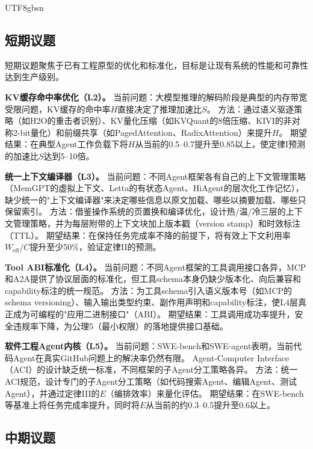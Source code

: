 \documentclass[11pt,a4paper]{article}
\begin{document}
\begin{CJK*}{UTF8}{gbsn}
\subsection{短期议题}

短期议题聚焦于已有工程原型的优化和标准化，目标是让现有系统的性能和可靠性达到生产级别。

\textbf{KV缓存命中率优化（L2）。}
当前问题：大模型推理的解码阶段是典型的内存带宽受限问题\cite{gholami2024memorywall}，KV缓存的命中率$H$直接决定了推理加速比$S$。
方法：通过语义驱逐策略（如H2O的重击者识别\cite{h2o2023}）、KV量化压缩（如KVQuant的8倍压缩\cite{hooper2024kvquant}、KIVI的非对称2-bit量化\cite{liu2024kivi}）和前缀共享（如PagedAttention\cite{kwon2023pagedattention}、RadixAttention\cite{sglang2024}）来提升$H$。
期望结果：在典型Agent工作负载下将$H$从当前的0.5--0.7提升至0.85以上，使定律I预测的加速比$S$达到5--10倍。

\textbf{统一上下文编译器（L3）。}
当前问题：不同Agent框架各有自己的上下文管理策略（MemGPT的虚拟上下文、Letta的有状态Agent、HiAgent的层次化工作记忆\cite{memgpt2023,letta_stateful_2026,hiagent2024}），缺少统一的"上下文编译器"来决定哪些信息以原文加载、哪些以摘要加载、哪些只保留索引。
方法：借鉴操作系统的页置换和编译优化，设计热/温/冷三层的上下文管理策略，并为每层附带的上下文块加上版本戳（version stamp）和时效标注（TTL）。
期望结果：在保持任务完成率不降的前提下，将有效上下文利用率$W_{\mathrm{eff}}/C$提升至少50\%，验证定律II的预测。

\textbf{Tool ABI标准化（L4）。}
当前问题：不同Agent框架的工具调用接口各异，MCP和A2A提供了协议层面的标准化，但工具schema本身仍缺少版本化、向后兼容和capability标注的统一规范\cite{mcp_intro_2026,agentprotocols2025}。
方法：为工具schema引入语义版本号（如MCP的schema versioning）、输入输出类型约束、副作用声明和capability标注，使L4层真正成为可编程的"应用二进制接口"（ABI）。
期望结果：工具调用成功率提升，安全违规率下降，为公理5（最小权限）的落地提供接口基础。

\textbf{软件工程Agent内核（L5）。}
当前问题：SWE-bench和SWE-agent表明，当前代码Agent在真实GitHub问题上的解决率仍然有限\cite{swebench2023,sweagent2024}。
Agent-Computer Interface（ACI）的设计缺乏统一标准，不同框架的子Agent分工策略各异。
方法：统一ACI规范，设计专门的子Agent分工策略（如代码搜索Agent、编辑Agent、测试Agent），并通过定律III的$E$（编排效率）来量化评估。
期望结果：在SWE-bench等基准上将任务完成率提升，同时将$E$从当前的约0.3--0.5提升至0.6以上。

\subsection{中期议题}


\end{CJK*}
\end{document}
